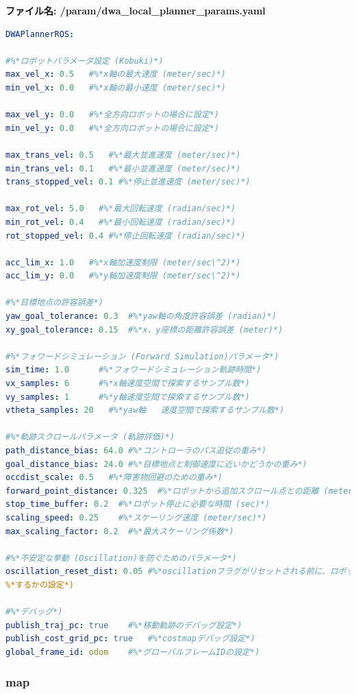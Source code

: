 \textbf{ファイル名: /param/dwa\_local\_planner\_params.yaml}
\begin{lstlisting}[language=YAML]
DWAPlannerROS:

#%*ロボットパラメータ設定 (Kobuki)*)
max_vel_x: 0.5   #%*x軸の最大速度 (meter/sec)*)
min_vel_x: 0.0   #%*x軸の最小速度 (meter/sec)*)

max_vel_y: 0.0   #%*全方向ロボットの場合に設定*)
min_vel_y: 0.0   #%*全方向ロボットの場合に設定*)

max_trans_vel: 0.5   #%*最大並進速度 (meter/sec)*)
min_trans_vel: 0.1   #%*最小並進速度 (meter/sec)*)
trans_stopped_vel: 0.1 #%*停止並進速度 (meter/sec)*)

max_rot_vel: 5.0   #%*最大回転速度 (radian/sec)*)
min_rot_vel: 0.4   #%*最小回転速度 (radian/sec)*)
rot_stopped_vel: 0.4 #%*停止回転速度 (radian/sec)*)

acc_lim_x: 1.0   #%*x軸加速度制限 (meter/sec\^2)*)
acc_lim_y: 0.0   #%*y軸加速度制限 (meter/sec\^2)*)

#%*目標地点の許容誤差*)
yaw_goal_tolerance: 0.3  #%*yaw軸の角度許容誤差 (radian)*)
xy_goal_tolerance: 0.15  #%*x、y座標の距離許容誤差 (meter)*)

#%*フォワードシミュレーション (Forward Simulation)パラメータ*)
sim_time: 1.0      #%*フォワードシミュレーション軌跡時間*)
vx_samples: 6      #%*x軸速度空間で探索するサンプル数*)
vy_samples: 1      #%*y軸速度空間で探索するサンプル数*)
vtheta_samples: 20   #%*yaw軸   速度空間で探索するサンプル数*)

#%*軌跡スクロールパラメータ (軌跡評価)*)
path_distance_bias: 64.0 #%*コントローラのパス追従の重み*)
goal_distance_bias: 24.0 #%*目標地点と制御速度に近いかどうかの重み*)
occdist_scale: 0.5   #%*障害物回避のための重み*)
forward_point_distance: 0.325  #%*ロボットから追加スクロール点との距離 (meter)*)
stop_time_buffer: 0.2  #%*ロボット停止に必要な時間 (sec)*)
scaling_speed: 0.25    #%*スケーリング速度 (meter/sec)*)
max_scaling_factor: 0.2  #%*最大スケーリング係数*)

#%*不安定な挙動 (Oscillation)を防ぐためのパラメータ*)
oscillation_reset_dist: 0.05 #%*oscillationフラグがリセットされる前に、ロボットがどのように移動*)
%*するかの設定*)

#%*デバッグ*)
publish_traj_pc: true    #%*移動軌跡のデバッグ設定*)
publish_cost_grid_pc: true   #%*costmapデバッグ設定*)
global_frame_id: odom    #%*グローバルフレームIDの設定*)
\end{lstlisting}

\subsubsection{map}

